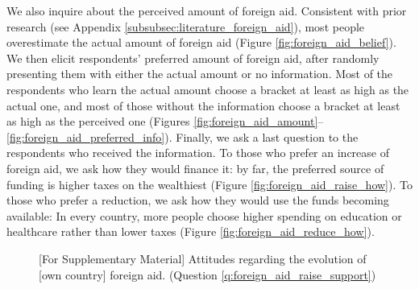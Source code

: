 We also inquire about the perceived amount of foreign aid. Consistent with prior research (see Appendix \ref{subsubsec:literature_foreign_aid}), most people overestimate the actual amount of foreign aid (Figure \ref{fig:foreign_aid_belief}). We then elicit respondents' preferred amount of foreign aid, after randomly presenting them with either the actual amount or no information. Most of the respondents who learn the actual amount choose a bracket at least as high as the actual one, and most of those without the information choose a bracket at least as high as the perceived one (Figures \ref{fig:foreign_aid_amount}--\ref{fig:foreign_aid_preferred_info}). Finally, we ask a last question to the respondents who received the information. To those who prefer an increase of foreign aid, we ask how they would finance it: by far, the preferred source of funding is higher taxes on the wealthiest (Figure \ref{fig:foreign_aid_raise_how}). To those who prefer a reduction, we ask how they would use the funds becoming available: %
In every country, more people choose higher spending on education or healthcare rather than lower taxes (Figure \ref{fig:foreign_aid_reduce_how}). 



\begin{figure}[h!]
  \caption[Attitudes on the evolution of foreign aid]{[For Supplementary Material] Attitudes regarding the evolution of [own country] foreign aid. (Question \ref{q:foreign_aid_raise_support})}\label{fig:foreign_aid_raise_support}
\end{figure}

